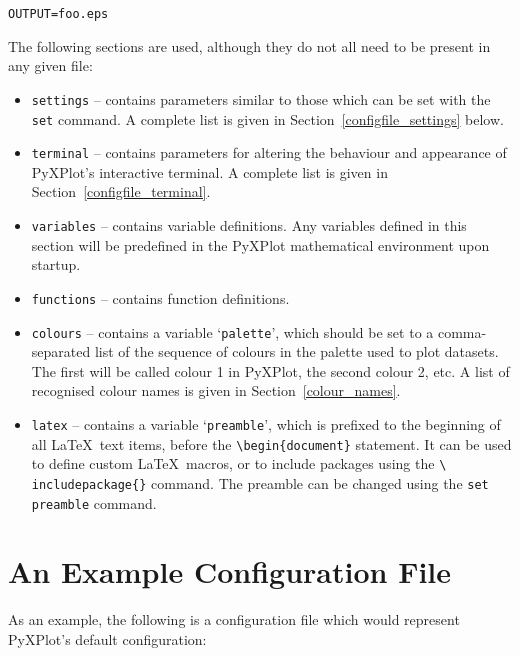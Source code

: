 \documentclass[a4paper,onecolumn,11pt]{book}
\begin{document}
\begin{verbatim} 
OUTPUT=foo.eps
\end{verbatim}

The following sections are used, although they do not all need to be present in
any given file:

\begin{itemize}
\item \texttt{settings} -- contains parameters similar to those which can be set with the \texttt{set} command. A complete list is given in Section~\ref{configfile_settings} below.
\item \texttt{terminal} -- contains parameters for altering the behaviour and appearance of PyXPlot's interactive terminal. A complete list is given in Section~\ref{configfile_terminal}.
\item \texttt{variables} -- contains variable definitions. Any variables defined in this section will be predefined in the PyXPlot mathematical environment upon startup.
\item \texttt{functions} -- contains function definitions.
\item \texttt{colours} -- contains a variable `\texttt{palette}', which should be set to a comma-separated list of the sequence of colours in the palette used to plot datasets. The first will be called colour 1 in PyXPlot, the second colour 2, etc. A list of recognised colour names is given in Section~\ref{colour_names}.
\item \texttt{latex} -- contains a variable `\texttt{preamble}', which is
prefixed to the beginning of all \LaTeX\ text items, before the
\texttt{\textbackslash begin\{document\}} statement. It can be used to define
custom \LaTeX\ macros, or to include packages using the \texttt{\textbackslash
includepackage\{\}} command.  The preamble can be changed using the {\tt set
preamble} command.
\end{itemize}

\section{An Example Configuration File}
\noindent As an example, the following is a configuration file
which would represent PyXPlot's default configuration:
\end{document}
